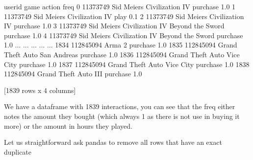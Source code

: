 \documentclass[letterpaper,10pt,english]{jupyterBook}
\begin{document}
\begin{sphinxVerbatim}[commandchars=\\\{\}]
  
\end{sphinxVerbatim}

\begin{sphinxVerbatim}[commandchars=\\\{\}]
        user\PYGZus{}id                                          game    action  freq
0      11373749                   Sid Meier\PYGZsq{}s Civilization IV  purchase   1.0
1      11373749                   Sid Meier\PYGZsq{}s Civilization IV      play   0.1
2      11373749                   Sid Meier\PYGZsq{}s Civilization IV  purchase   1.0
3      11373749  Sid Meier\PYGZsq{}s Civilization IV Beyond the Sword  purchase   1.0
4      11373749  Sid Meier\PYGZsq{}s Civilization IV Beyond the Sword  purchase   1.0
...         ...                                           ...       ...   ...
1834  112845094                                        Arma 2  purchase   1.0
1835  112845094                  Grand Theft Auto San Andreas  purchase   1.0
1836  112845094                    Grand Theft Auto Vice City  purchase   1.0
1837  112845094                    Grand Theft Auto Vice City  purchase   1.0
1838  112845094                          Grand Theft Auto III  purchase   1.0

[1839 rows x 4 columns]
\end{sphinxVerbatim}

\sphinxAtStartPar
We have a dataframe with 1839 interactions, you can see that the freq either notes the amount they bought (which always 1 as there is not use in buying it more) or the amount in hours they played.

\sphinxAtStartPar
Let us straightforward ask pandas to remove all rows that have an exact duplicate

\begin{sphinxVerbatim}[commandchars=\\\{\}]
\end{sphinxVerbatim}
\end{document}
